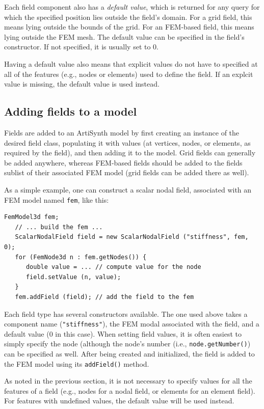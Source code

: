 Each field component also has a {\it default value}, which is returned
for any query for which the specified position lies outside the field's
domain. For a grid field, this means lying outside the bounds of the
grid. For an FEM-based field, this means lying outside the FEM mesh.
The default value can be specified in the field's constructor. If not
specified, it is usually set to 0.

\begin{sideblock}
Having a default value also means that explicit values do not have to
specified at all of the features (e.g., nodes or elements) used to
define the field. If an explcit value is missing, the default value is
used instead.
\end{sideblock}

\subsection{Adding fields to a model}

Fields are added to an ArtiSynth model by first creating an instance
of the desired field class, populating it with values (at vertices,
nodes, or elements, as required by the field), and then adding it to
the model. Grid fields can generally be added anywhere, whereas
FEM-based fields should be added to the {\sf fields} sublist of their
associated FEM model (grid fields can be added there as well).

As a simple example, one can construct a scalar nodal field, associated
with an FEM model named {\tt fem}, like this:
%
\begin{lstlisting}[]
   FemModel3d fem; 
   // ... build the fem ...
   ScalarNodalField field = new ScalarNodalField ("stiffness", fem, 0);
   for (FemNode3d n : fem.getNodes()) {
      double value = ... // compute value for the node
      field.setValue (n, value);
   }
   fem.addField (field); // add the field to the fem
\end{lstlisting}
%
Each field type has several constructors available. The one used above
takes a component name ({\tt "stiffness"}), the FEM modal associated with
the field, and a default value (0 in this case). When setting field
values, it is often easiest to simply specify the node (although the
node's number (i.e., {\tt node.getNumber()}) can be specified as well.
After being created and initialized, the field is added to the FEM
model using its {\tt addField()} method.

\begin{sideblock}
As noted in the previous section, it is not necessary to specify
values for all the features of a field (e.g., nodes for a nodal field,
or elements for an element field). For features with undefined values,
the default value will be used instead.
\end{sideblock}

